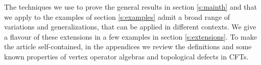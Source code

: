 \documentclass[11pt,reqno]{article}
\newcommand{\be}{\begin{equation}}
\newcommand{\ee}{\end{equation}}
\DeclareMathOperator{\Tr}{Tr}
\DeclareMathOperator{\Com}{Com}
\newcommand{\ZZ}{\mathbb{Z}}
\newcommand{\paraf}{\mathcal{P}}
\begin{document}
The techniques we use to prove the general results in section \ref{s:mainth} and that we apply to the examples of section \ref{s:examples} admit a broad range of variations and generalizations, that can be applied in different contexts. We give a flavour of these extensions in a few examples in section \ref{s:extensions}. To make the article self-contained, in the appendices we review the definitions and some known properties of vertex operator algebras and topological defects in CFTs.


%
%
%
%
\end{document}
